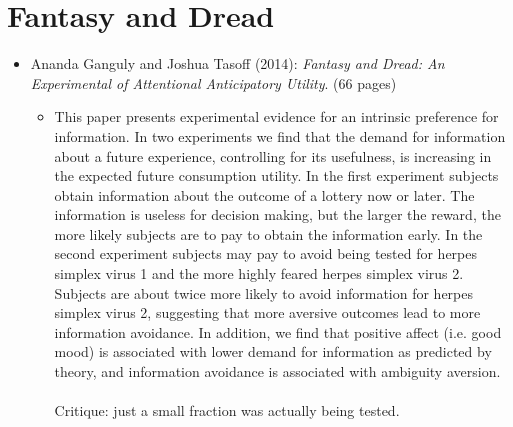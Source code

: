 \section{Fantasy and Dread}
\begin{itemize}
	\item Ananda Ganguly and Joshua Tasoff (2014): \textit{Fantasy and Dread: An Experimental of Attentional Anticipatory Utility}. (66 pages)
		\begin{itemize}
			\item This paper presents experimental evidence for an intrinsic preference for information. In two experiments we find that the demand for information about a future experience, controlling for its usefulness, is increasing in the expected future consumption utility. In the first experiment subjects obtain information about the outcome of a lottery now or later. The information is useless for decision making, but the larger the reward, the more likely subjects are to pay to obtain the information early. In the second experiment subjects may pay to avoid being tested for herpes simplex virus 1 and the more highly feared herpes simplex virus 2. Subjects are about twice more likely to avoid information for herpes simplex virus 2, suggesting that more aversive outcomes lead to more information avoidance. In addition, we find that positive affect (i.e. good mood) is associated with lower demand for information as predicted by theory, and information avoidance is associated with ambiguity aversion. \\ \\
				
				Critique: just a small fraction was actually being tested. 
		\end{itemize}
\end{itemize}


\newpage
